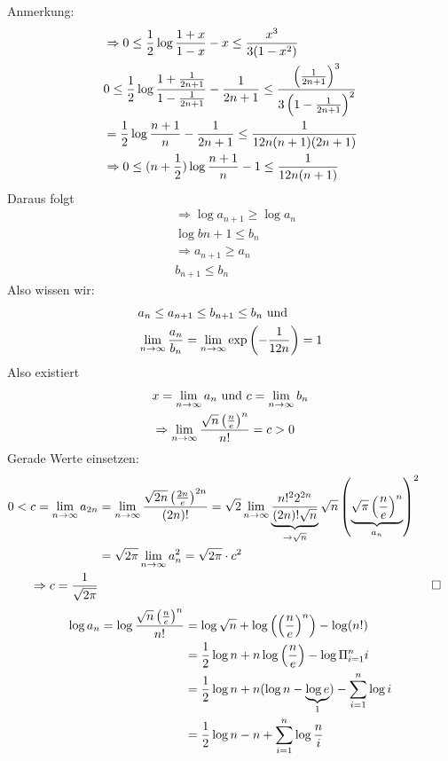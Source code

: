 Anmerkung:
\begin{align*}
    &\Rightarrow 0 \leq \frac{1}{2} \log \frac{1 +x}{1-x} - x \leq \frac{x^3}{3(1- x^2)}\\
    &0 \leq \frac{1}{2} \log \frac{1 + \frac{1}{2n+1}}{1 - \frac{1}{2n+1}} - \frac{1}{2n+1} \leq \frac{\left(\frac{1}{2n+1}\right)^3}{3\left(1 - \frac{1}{2n+1}\right)^2}\\
    &= \frac{1}{2} \log \frac{n+1}{n} - \frac{1}{2n+1} \leq \frac{1}{12n(n+1)(2n+1)}\\
    &\Rightarrow 0 \leq (n + \frac{1}{2}) \log \frac{n+1}{n} - 1 \leq \frac{1}{12n(n+1)}
\end{align*}
Daraus folgt
\begin{align*}
    &\Rightarrow \log a_{n+1} \geq \log a_n\\
    &\log b{n+1} \leq b_n\\
    &\Rightarrow a_{n+1} \geq a_n\\
    &b_{n+1} \leq b_n
\end{align*}
Also wissen wir:
\begin{align*}
    &a_n \leq a_{n+1} \leq b_{n+1} \leq b_n \text{ und }\\ &\lim_{n \rightarrow \infty} \frac{a_n}{b_n} = \lim_{n \rightarrow \infty} \exp\left( - \frac{1}{12n}\right) = 1
\end{align*}
Also existiert
\begin{align*}
    &x = \lim_{n \rightarrow \infty} a_n \text{ und } c = \lim_{n \rightarrow \infty} b_n\\
    &\Rightarrow \lim_{n \rightarrow \infty} \frac{\sqrt{n} \left(\frac{n}{e}\right)^n}{n!} = c > 0
\end{align*}
Gerade Werte einsetzen:
\begin{align*}
    0 < c = \lim_{n \rightarrow \infty} a_{2n} &= \lim_{n \rightarrow \infty} \frac{\sqrt{2n}\left(\frac{2n}{e}\right)^{2n}}{(2n)!} = \sqrt{2} \lim_{n \rightarrow \infty} \underbrace{\frac{n!^22^{2n}}{(2n)! \sqrt{n}}}_{\rightarrow \sqrt{n}} \sqrt{n} \left( \underbrace{\sqrt{\pi} \left(\frac{n}{e}\right)^n}_{a_n}\right)^2\\
    &= \sqrt{2\pi} \lim_{n \rightarrow \infty} a^2_n = \sqrt{2\pi} \cdot c^2\\
    \Rightarrow c = \frac{1}{\sqrt{2\pi}} &&&\square
\end{align*}
\newcommand{\ndurche}{\left(\frac{n}{e}\right)}
\renewcommand{\summeeinsbisn}{\sum_{i = 1}^{n}}
\begin{align*}
    \log a_n = \log \frac{\sqrt{n} \ndurche^n}{n!} &= \log \sqrt{n} + \log \left(\ndurche^n\right) - \log (n!)\\
    &= \frac{1}{2} \log n + n \log \ndurche - \log \pivoneinsbisn i\\
    &= \frac{1}{2} \log n + n(\log n  - \underbrace{\log e}_{1}) - \sum_{i = 1}^n \log i\\
    &= \frac{1}{2} \log n - n + \sum_{i=1}^{n} \log \frac{n}{i}
\end{align*}

